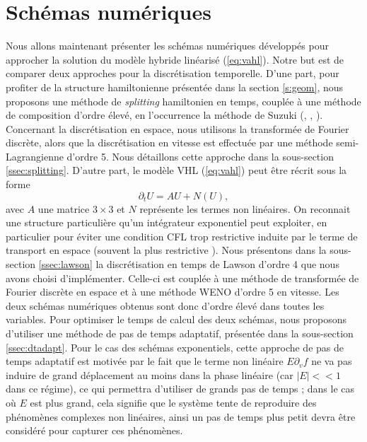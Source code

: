 
\section{Schémas numériques}
\label{s:scheme}

Nous allons maintenant présenter les schémas numériques développés pour approcher la solution du modèle hybride linéarisé (\ref{eq:vahl}). Notre but est de comparer deux approches pour la discrétisation temporelle. D'une part, pour profiter de la structure hamiltonienne présentée dans la section \ref{s:geom}, nous proposons une méthode de \emph{splitting} hamiltonien en temps, couplée à une méthode de composition d'ordre élevé, en l’occurrence la méthode de Suzuki (\cite{Suzuki:1990}, \cite{Hairer:2006}, \cite{Blanes:2019}). Concernant la discrétisation en espace, nous utilisons la transformée de Fourier discrète, alors que la discrétisation en vitesse est effectuée par une méthode semi-Lagrangienne d'ordre 5. Nous détaillons cette approche dans la sous-section \ref{ssec:splitting}. D'autre part, le modèle VHL (\ref{eq:vahl}) peut être récrit sous la forme 
$$
  \partial_t U = AU + N(U), 
$$
avec $A$ une matrice $3\times 3$ et $N$ représente les termes non linéaires. On reconnait une structure particulière qu'un intégrateur exponentiel peut exploiter, en particulier pour éviter une condition CFL trop restrictive induite par le terme de transport en espace (souvent la plus restrictive \cite{Crouseilles:2019b}). Nous présentons dans la sous-section \ref{ssec:lawson} la discrétisation en temps de Lawson d'ordre 4 que nous avons choisi d'implémenter. Celle-ci est couplée à une méthode de transformée de Fourier discrète en espace et à une méthode WENO d'ordre 5 en vitesse. Les deux schémas numériques obtenus sont donc d'ordre élevé dans toutes les variables. Pour optimiser le temps de calcul des deux schémas, nous proposons d'utiliser une méthode de pas de temps adaptatif, présentée dans la sous-section \ref{ssec:dtadapt}. Pour le cas des schémas exponentiels, cette approche de pas de temps adaptatif est motivée par le fait que le terme non linéaire $E\partial_v f$ ne va pas induire de grand déplacement au moins dans la phase linéaire (car $|E|<\!\!< 1$ dans ce régime), ce qui permettra d'utiliser de grands pas de temps ; dans le cas où $E$ est plus grand, cela signifie que le système tente de reproduire des phénomènes complexes non linéaires, ainsi un pas de temps plus petit devra être considéré pour capturer ces  phénomènes. 

